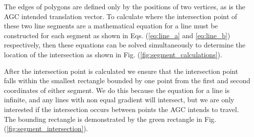 \documentclass[11pt,landscape]{article}
\begin{document}
\begin{multicols}{3}
The edges of polygons are defined only by the positions of two vertices, as is
the AGC intended translation vector. To calculate where the intersection point
of these two line segments are a mathematical equation for a line must be
constructed for each segment as shown in Eqs. (\ref{eq:line_a} and
\ref{eq:line_b}) respectively, then these equations can be solved simultaneously
to determine the location of the intersection as shown in Fig.
(\ref{fig:segment_calculations}).

After the intersection point is calculated we ensure that the intersection point
falls within the smallest rectangle bounded by one point from the first and
second coordinates of either segment. We do this because the equation for a line is infinite, and
any lines with non equal gradient will intersect, but we are only interested if
the intersection occurs between points the AGC intends to travel. The bounding
rectangle is demonstrated by the green rectangle in Fig. (\ref{fig:segment_intersection}).


\end{multicols}
\end{document}
